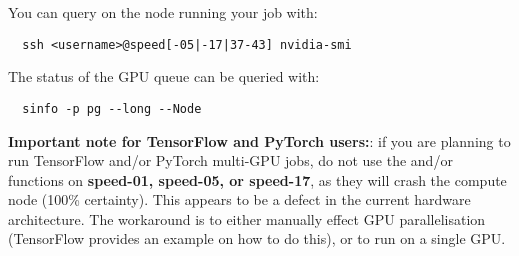 \noindent You can query  on the node running your job with:
\begin{verbatim}
  ssh <username>@speed[-05|-17|37-43] nvidia-smi
\end{verbatim}

\noindent The status of the GPU queue can be queried with:
\begin{verbatim}
  sinfo -p pg --long --Node
\end{verbatim}

\noindent \textbf{Important note for TensorFlow and PyTorch users:}:
if you are planning to run TensorFlow and/or PyTorch multi-GPU jobs, 
do not use the  and/or  functions 
on \textbf{speed-01, speed-05, or speed-17}, as they will crash the compute node (100\% certainty). 
This appears to be a defect in the current hardware architecture.
%
The workaround is to either manually effect GPU parallelisation
(TensorFlow provides an example on how to do this), or to run on a single GPU.\\

